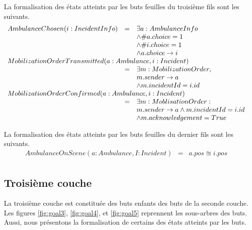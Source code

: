 	La formalisation des états atteints par les buts feuilles du troisième fils sont
	les suivants.
	\singlespacing
	\begin{equation*}
		\begin{array}{rcl}
			AmbulanceChosen(i:IncidentInfo)  
			& = & \exists a:AmbulanceInfo \\
			&   & \wedge \#a.choice = 1 \\
			&   & \wedge \#i.choice = 1 \\
			&   & \wedge a.choice \rightarrow i \\
			
			\multicolumn{3}{l}{MobilizationOrderTransmitted(a: Ambulance, i:Incident)} \\ 
			& = & \exists m: MobilizationOrder, \\
			&   & m.sender \rightarrow a \\
			&   & \wedge  m.incidentId = i.id \\
			
			\multicolumn{3}{l}{MobilizationOrderConfirmed(a:Ambulance, i:Incident)} \\ 
			& = & \exists m:MoblisationOrder: \\
			&   & m.sender \rightarrow a \wedge m.incidentId = i.id \\ 
			&   & \wedge m.acknowledgement = True \\
		\end{array}
	\end{equation*}
	\onehalfspacing
	
	La formalisation des états atteints par les buts feuilles du dernier fils sont
	les suivants.		
	\singlespacing
	\begin{equation*}
		\begin{array}{rcl}
			AmbulanceOnScene(a:Ambulance, I:Incident)
			& = & a.pos \approxeq i.pos \\ 
		\end{array}
	\end{equation*}
	\onehalfspacing


\subsection{Troisième couche}

	La troisième couche est constituée des buts enfants
	des buts de la seconde couche. Les figures \ref{fig:goal3}, \ref{fig:goal4},
	et \ref{fig:goal5} reprennent les sous-arbres des buts. Aussi, nous
	présentons la formalisation de certains des états atteints par les
	buts.

